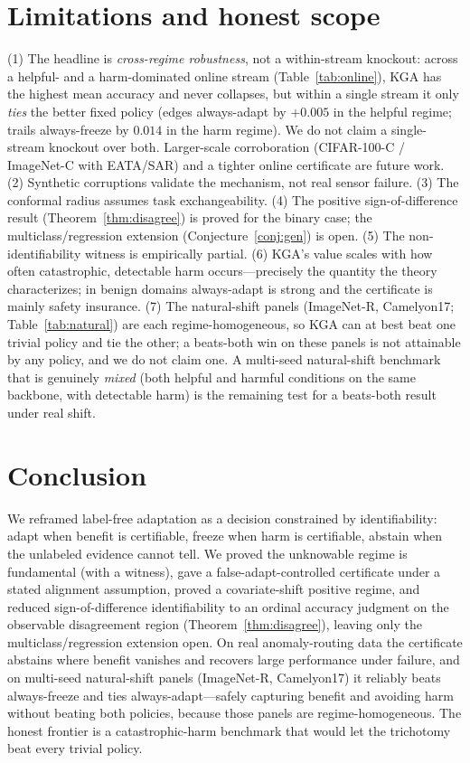 \documentclass[11pt]{article}
\theoremstyle{plain}
\theoremstyle{definition}
\begin{document}
\section{Limitations and honest scope}\label{sec:limits}
(1) The headline is \emph{cross-regime robustness}, not a within-stream knockout: across a
helpful- and a harm-dominated online stream (Table~\ref{tab:online}), \textsc{KGA} has the
highest mean accuracy and never collapses, but within a single stream it only \emph{ties}
the better fixed policy (edges always-adapt by $+0.005$ in the helpful regime; trails
always-freeze by $0.014$ in the harm regime). We do not claim a single-stream knockout over
both. Larger-scale corroboration (CIFAR-100-C / ImageNet-C with EATA/SAR) and a tighter
online certificate are future work.
(2) Synthetic corruptions validate the mechanism, not real sensor failure.
(3) The conformal radius assumes task exchangeability.
(4) The positive sign-of-difference result (Theorem~\ref{thm:disagree}) is proved for
the binary case; the multiclass/regression extension (Conjecture~\ref{conj:gen}) is open.
(5) The non-identifiability witness is empirically partial.
(6) \textsc{KGA}'s value scales with how often catastrophic, detectable harm
occurs---precisely the quantity the theory characterizes; in benign domains
always-adapt is strong and the certificate is mainly safety insurance.
(7) The natural-shift panels (ImageNet-R, Camelyon17; Table~\ref{tab:natural}) are
each regime-homogeneous, so \textsc{KGA} can at best beat one trivial policy and tie
the other; a beats-both win on these panels is not attainable by any policy, and we do
not claim one. A multi-seed natural-shift benchmark that is genuinely \emph{mixed}
(both helpful and harmful conditions on the same backbone, with detectable harm) is the
remaining test for a beats-both result under real shift.

\section{Conclusion}
We reframed label-free adaptation as a decision constrained by identifiability: adapt
when benefit is certifiable, freeze when harm is certifiable, abstain when the
unlabeled evidence cannot tell. We proved the unknowable regime is fundamental (with a
witness), gave a false-adapt-controlled certificate under a stated alignment
assumption, proved a covariate-shift positive regime, and reduced sign-of-difference
identifiability to an ordinal accuracy judgment on the observable disagreement region
(Theorem~\ref{thm:disagree}), leaving only the multiclass/regression extension open. On real
anomaly-routing data the certificate abstains where benefit vanishes and recovers large
performance under failure, and on multi-seed natural-shift panels (ImageNet-R, Camelyon17)
it reliably beats always-freeze and ties always-adapt---safely capturing benefit and
avoiding harm without beating both policies, because those panels are regime-homogeneous.
The honest frontier is a catastrophic-harm benchmark that would let the trichotomy beat
every trivial policy.
\end{document}
